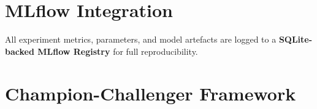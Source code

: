 \documentclass[12pt,a4paper]{report}
\begin{document}
\section{MLflow Integration}

All experiment metrics, parameters, and model artefacts are logged to a
\textbf{SQLite-backed MLflow Registry} for full reproducibility.

\section{Champion-Challenger Framework}

\end{document}

